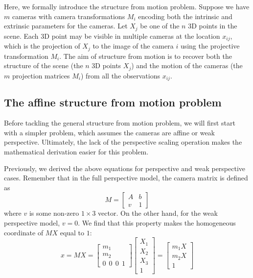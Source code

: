 \documentclass[a4paper, 12pt]{article}
\numberwithin{equation}{section}
\begin{document}
Here, we formally introduce the structure from motion problem. Suppose we have $m$ cameras with camera transformations $M_i$ encoding both the intrinsic and extrinsic parameters for the cameras. Let $X_j$ be one of the $n$ 3D points in the scene. Each 3D point may be visible in multiple cameras at the location $x_{ij}$, which is the projection of $X_j$  to the image of the camera $i$ using the projective transformation $M_i$. The aim of structure from motion is to recover both the structure of the scene (the $n$ 3D points $X_j$) and the motion of the cameras (the $m$ projection matrices $M_i$) from all the observations $x_{ij}$. 

\subsection{The affine structure from motion problem}
Before tackling the general structure from motion problem, we will first start with a simpler problem, which assumes the cameras are affine or weak perspective. Ultimately, the lack of the perspective scaling operation makes the mathematical derivation easier for this problem. 

Previously, we derived the above equations for perspective and weak perspective cases. Remember that in the full perspective model, the camera matrix is defined as 
\begin{equation}
M = \begin{bmatrix}
    A & b \\ v & 1
\end{bmatrix}    
\end{equation}
where $v$ is some non-zero $1\times3$ vector. On the other hand, for the weak perspective model, $v=0$. We find that this property makes the homogeneous coordinate of $MX$ equal to $1$: 
\begin{equation}
    x = MX = \begin{bmatrix}m_1 \\ m_2 \\ 0 ~~ 0 ~~ 0 ~~ 1\end{bmatrix} \begin{bmatrix}X_1\\X_2\\X_3 \\ 1\end{bmatrix} = \begin{bmatrix}m_1X \\ m_2 X \\ 1\end{bmatrix}
\end{equation}
\end{document}
